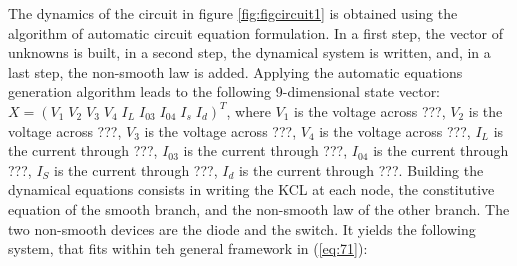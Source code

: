 The dynamics of the circuit in figure \ref{fig:figcircuit1} is obtained using the algorithm of automatic circuit equation formulation.
In a first step, the vector of unknowns is built, in a second step, the dynamical system is
written, and, in a last step, the non-smooth law is added. Applying the automatic equations generation algorithm leads to the following 9-dimensional state vector: $X=(V_1\;V_2\;V_3\;V_4\;I_L\;I_{03}\;I_{04}\;I_s\;I_d)^{T}$, where $V_{1}$ is the voltage across ???, $V_{2}$ is the voltage across ???, $V_{3}$ is the voltage across ???, $V_{4}$ is the voltage across ???, $I_{L}$ is the current through ???, $I_{03}$ is the current through ???, $I_{04}$ is the current through ???, $I_{S}$ is the current through ???, $I_{d}$ is the current through ???.  Building the dynamical equations consists in writing the KCL at each node, the constitutive equation of the smooth branch, and the
non-smooth law of the other branch. The two non-smooth devices are the diode and the switch. It yields the following system, that fits within teh general framework in (\ref{eq:71}): 

